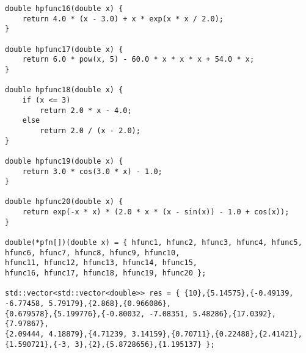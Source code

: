 \documentclass{report}
\begin{document}
\begin{lstlisting}
double hpfunc16(double x) {
    return 4.0 * (x - 3.0) + x * exp(x * x / 2.0);
}

double hpfunc17(double x) {
    return 6.0 * pow(x, 5) - 60.0 * x * x * x + 54.0 * x;
}

double hpfunc18(double x) {
    if (x <= 3)
        return 2.0 * x - 4.0;
    else
        return 2.0 / (x - 2.0);
}

double hpfunc19(double x) {
    return 3.0 * cos(3.0 * x) - 1.0;
}

double hpfunc20(double x) {
    return exp(-x * x) * (2.0 * x * (x - sin(x)) - 1.0 + cos(x));
}

double(*pfn[])(double x) = { hfunc1, hfunc2, hfunc3, hfunc4, hfunc5,
hfunc6, hfunc7, hfunc8, hfunc9, hfunc10,
hfunc11, hfunc12, hfunc13, hfunc14, hfunc15,
hfunc16, hfunc17, hfunc18, hfunc19, hfunc20 };

std::vector<std::vector<double>> res = { {10},{5.14575},{-0.49139, -6.77458, 5.79179},{2.868},{0.966086},
{0.679578},{5.199776},{-0.80032, -7.08351, 5.48286},{17.0392},{7.97867},
{2.09444, 4.18879},{4.71239, 3.14159},{0.70711},{0.22488},{2.41421},
{1.590721},{-3, 3},{2},{5.8728656},{1.195137} };
\end{lstlisting}
\end{document}
